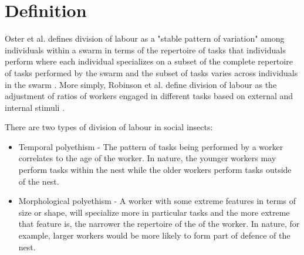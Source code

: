 \section{Definition}
\label{sec:second:definition}

Oster et al. defines division of labour as a "stable pattern of variation" among individuals within a swarm in terms of the repertoire of tasks that individuals perform where each individual specializes on a subset of the complete repertoire of tasks performed by the swarm and the subset of tasks varies across individuals in the swarm \cite{oster1978caste}.  
More simply, Robinson et al. define division of labour as the adjustment of ratios of workers engaged in different tasks based on external and internal stimuli \cite{robinson1992regulation}.

There are two types of division of labour in social insects: 
\begin{itemize}
	\item Temporal polyethism - The pattern of tasks being performed by a worker correlates to the age of the worker. In nature, the younger workers may perform tasks within the nest while the older workers perform tasks outside of the nest.
	\item Morphological polyethism - A worker with some extreme features in terms of size or shape, will specialize more in particular tasks and the more extreme that feature is, the narrower the repertoire of the of the worker. In nature, for example, larger workers would be more likely to form part of defence of the nest. \cite{beshers2001models}
\end{itemize}



